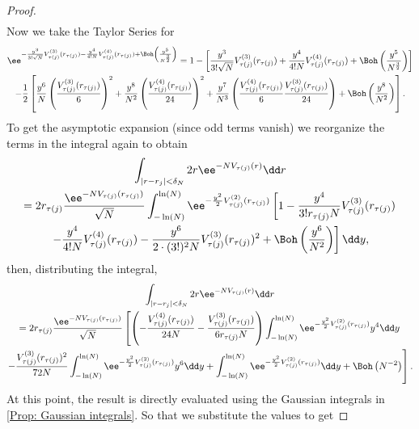 \begin{proof}
\begin{align}
	\end{align}
	Now we take the Taylor Series for 
	\begin{multline}
		\ee^{- \frac{y^3}{3! \sqrt{N}} V^{(3)}_{\tau(j)}(r_{\tau(j)}) - \frac{y^4}{4! N} V^{(4)}_{\tau(j)}(r_{\tau(j)}) + \Boh\left(\frac{y^5}{N^\frac{3}{2}}\right)} = 1 - \left[ \frac{y^3}{3! \sqrt{N}} V^{(3)}_{\tau(j)}(r_{\tau(j)}) + \frac{y^4}{4! N} V^{(4)}_{\tau(j)}(r_{\tau(j)}) + \Boh\left(\frac{y^5}{N^\frac{3}{2}}\right) \right] \\ 
		- \frac{1}{2} \left[ \frac{y^6}{N} \left(\frac{V^{(3)}_{\tau(j)}(r_{\tau(j)})}{6} \right)^2 + \frac{y^8}{N^2} \left(\frac{V^{(4)}_{\tau(j)}(r_{\tau(j)})}{24} \right)^2 + \frac{y^7}{N^3} \left(\frac{V^{(4)}_{\tau(j)}(r_{\tau(j)})}{6} \frac{V^{(3)}_{\tau(j)}(r_{\tau(j)})}{24} \right) + \Boh\left(\frac{y^8}{N^2}\right)  \right].
	\end{multline}
	To get the asymptotic expansion (since odd terms vanish) we reorganize the terms in the integral again to obtain
	\begin{multline}
		\int_{|r - r_j| < \delta_N} 2r \ee^{-N V_{\tau(j)}(r)} \dd r\\ = 2 r_{\tau(j)} \frac{\ee^{-N V_{\tau(j)}(r_{\tau(j)})}}{\sqrt{N}}  \int_{-\ln(N)}^{\ln(N)} \ee^{-\frac{y^2}{2} V^{(2)}_{\tau(j)}(r_{\tau(j)})} \left[ 1 - \frac{y^4}{3! r_{\tau(j)} N} V^{(3)}_{\tau(j)}(r_{\tau(j)}) \right. \\
		\left. - \frac{y^4}{4! N} V^{(4)}_{\tau(j)}(r_{\tau(j)}) - \frac{y^6}{2 \cdot (3!)^2 N} V^{(3)}_{\tau(j)}(r_{\tau(j)})^2 + \Boh\left(\frac{y^6}{N^2}\right) \right] \dd y,
		\label{Equation: value-contributing integral}
	\end{multline}
	then, distributing the integral,
	\begin{multline}
		\int_{|r - r_j| < \delta_N} 2r \ee^{-N V_{\tau(j)}(r)} \dd r\\ 
		 = 2 r_{\tau(j)} \frac{\ee^{-N V_{\tau(j)}(r_{\tau(j)})}}{\sqrt{N}}
		 \left[
		\left(- \frac{V^{(4)}_{\tau(j)}(r_{\tau(j)})}{24 N} - \frac{V^{(3)}_{\tau(j)}(r_{\tau(j)})}{6 r_{\tau(j)} N} \right)
		\int_{-\ln(N)}^{\ln(N)} \ee^{-\frac{y^2}{2} V^{(2)}_{\tau(j)}(r_{\tau(j)})} y^4 \dd y \right. \\
		\left. - \frac{V^{(3)}_{\tau(j)}(r_{\tau(j)})^2}{72 N}
		\int_{-\ln(N)}^{\ln(N)} \ee^{-\frac{y^2}{2} V^{(2)}_{\tau(j)}(r_{\tau(j)})} y^6 \dd y +
		\int_{-\ln(N)}^{\ln(N)} \ee^{-\frac{y^2}{2} V^{(2)}_{\tau(j)}(r_{\tau(j)})} \dd y + \Boh\left( N^{-2} \right) \right].
	\end{multline}
	At this point, the result is directly evaluated using the Gaussian integrals in \autoref{Prop: Gaussian integrals}.	So that we substitute the values to get

\end{proof}
